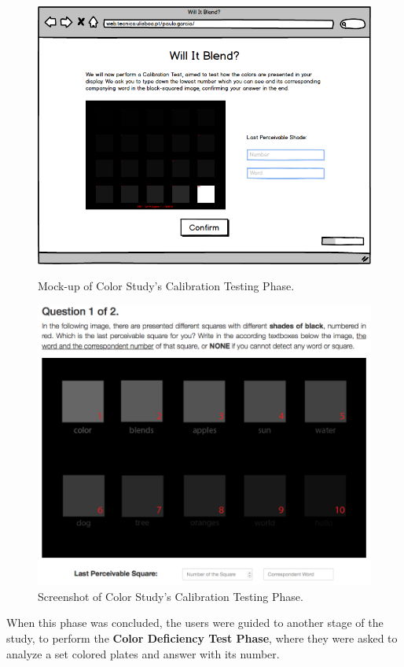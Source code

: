 \begin{figure}[htbp]
  \centering
  \begin{minipage}{0.4\textwidth}
		\centering
	  \includegraphics[width=\textwidth]{images/implementation/mockup_calibration.png}
	  \caption[Mock-up of Color Study's Calibration Testing Phase.]{Mock-up of Color Study's Calibration Testing Phase.}
	  \label{fig:mockup_calibration}
  \end{minipage} \hfill
	\begin{minipage}{0.4\textwidth}
		\centering
		\includegraphics[width=\textwidth]{images/implementation/screen_calibration.png}
		\caption[Screenshot of Color Study's Calibration Testing Phase.]{Screenshot of Color Study's Calibration Testing Phase.}
		\label{fig:screen_calibration}
	\end{minipage}
\end{figure}
%
When this phase was concluded, the users were guided to another stage of the study, to perform the \textbf{Color Deficiency Test Phase}, where
they were asked to analyze a set colored plates and answer with its number. \par
%
%
